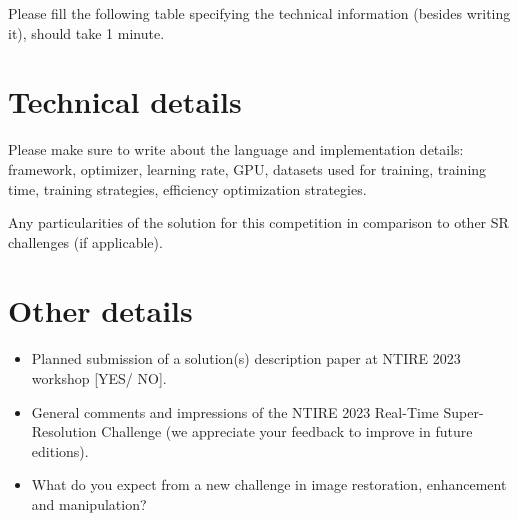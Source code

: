 \documentclass{article}
\begin{document}
\vspace{4mm}
Please fill the following table specifying the technical information (besides writing it), should take 1 minute. 

\begin{table}[]
    \centering
    \caption{FILL THIS TABLE PLEASE}
    \label{tab:my_label}
\end{table}

\section{Technical details}
Please make sure to write about the language and implementation details: framework, optimizer, learning rate, GPU, datasets used for training, training time, training strategies, efficiency optimization strategies.

\vspace{4mm}
\noindent Any particularities of the solution for this competition in comparison to other SR challenges (if applicable).

\section{Other details}
\begin{itemize}

\item Planned submission of a solution(s) description paper at NTIRE 2023 workshop [YES/ NO].

\item General comments and impressions of the NTIRE 2023 Real-Time Super-Resolution Challenge (we appreciate your feedback to improve in future editions).

\item What do you expect from a new challenge in image restoration, enhancement and manipulation?

\end{itemize}
\end{document}
